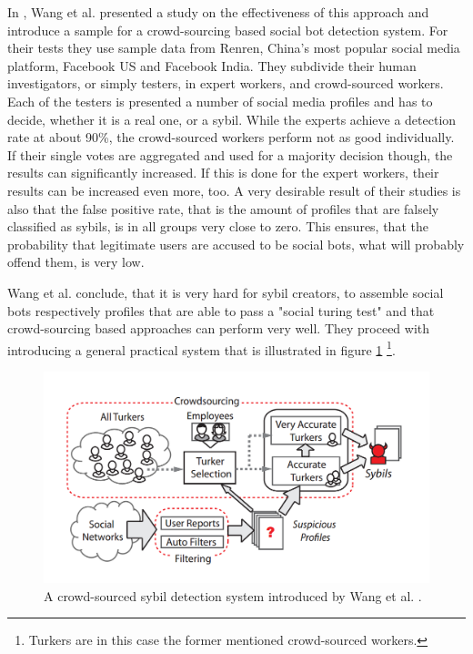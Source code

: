 In \cite{wangcrowd}, Wang et al. presented a study on the effectiveness of this approach and introduce a sample for a crowd-sourcing based social bot detection system.  For their tests they use sample data from Renren, China's most popular social media platform, Facebook US and Facebook India. They subdivide their human investigators, or simply testers, in expert workers, and crowd-sourced workers.  Each of the testers is presented a number of social media profiles and has to decide, whether it is a real one, or a sybil. While the experts achieve a detection rate at about 90\%, the crowd-sourced workers perform not as good individually. If their single votes are aggregated and used for a majority decision though, the results can significantly increased. If this is done for the expert workers, their results can be increased even more, too. A very desirable result of their studies is also that the false positive rate, that is the amount of profiles that are falsely classified as sybils, is in all groups very close to zero. This ensures, that the probability that legitimate users are accused to be social bots, what will probably offend them, is very low.

Wang et al. conclude, that it is very hard for sybil creators, to assemble social bots respectively profiles that are able to pass a "social turing test" and that crowd-sourcing based approaches can perform very well. They proceed with introducing a general practical system that is illustrated in figure \ref{crowdsys} \footnote{Turkers are in this case the former mentioned crowd-sourced workers.}.

\begin{figure}
	\centering
	\includegraphics[scale=0.4]{fig/crowdsys}
	\caption{A crowd-sourced sybil detection system introduced by Wang et al. \cite{wangcrowd}.}
	\label{crowdsys}
\end{figure}

